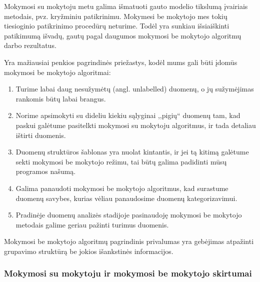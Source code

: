 Mokymosi su mokytoju metu galima išmatuoti gauto modelio tikslumą įvairiais metodais, pvz.
kryžminiu patikrinimu. Mokymesi be mokytojo mes tokių tiesioginio patikrinimo
procedūrų neturime. Todėl yra sunkiau išsiaiškinti patikimumą išvadų, gautų pagal
daugumos mokymosi be mokytojo algoritmų darbo rezultatus. 

Yra mažiausiai penkios pagrindinės priežastys, kodėl mums gali būti įdomūs
mokymosi be mokytojo algoritmai:

\begin{enumerate}
	\item Turime labai daug nesužymėtų (angl. unlabelled) duomenų, o jų
	sužymėjimas rankomis būtų labai brangus. 
	\item Norime apsimokyti su dideliu kiekiu sąlyginai ,,pigių`` duomenų tam,
	kad paskui galėtume	pasitelkti mokymosi su mokytoju algoritmus, ir tada
	detaliau ištirti duomenis.
	\item Duomenų struktūros šablonas yra nuolat kintantis, ir jei tą kitimą
	galėtume sekti mokymosi be mokytojo režimu, tai būtų galima padidinti 
	mūsų programos našumą.
	\item Galima panaudoti mokymosi be mokytojo algoritmus, kad surastume
	duomenų savybes, kurias vėliau panaudosime duomenų kategorizavimui.
	\item Pradinėje duomenų analizės stadijoje pasinaudoję mokymosi be mokytojo
	metodais galime geriau pažinti turimus duomenis.
\end{enumerate}

Mokymosi be mokytojo algoritmų pagrindinis privalumas yra gebėjimas atpažinti
grupavimo struktūrą be jokios išankstinės informacijos.




\subsubsection{Mokymosi su mokytoju ir mokymosi be mokytojo skirtumai}

